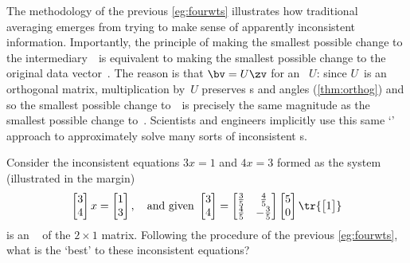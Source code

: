 The methodology of the previous \autoref{eg:fourwts} illustrates how traditional averaging emerges from trying to make sense of apparently inconsistent information.
Importantly, the principle of making the smallest possible change to the intermediary~\zv\ is equivalent to making the smallest possible change to the original data vector~\bv.
The reason is that \(\bv=U\zv\) for an ~\(U\): since \(U\)~is an orthogonal matrix, multiplication by~\(U\) preserves s and angles (\autoref{thm:orthog}) and so the smallest possible change to~\bv\ is precisely the same magnitude as the smallest possible change to~\zv.
Scientists and engineers implicitly use this same `' approach to approximately solve many sorts of inconsistent s.




\begin{activity}
Consider the inconsistent equations \(3x=1\) and \(4x=3\) formed as the system (illustrated in the margin)
%
\begin{equation*}
\begin{bmatrix} 3\\4 \end{bmatrix}x=\begin{bmatrix} 1\\3 \end{bmatrix},
\quad\text{and given }
\begin{bmatrix} 3\\4 \end{bmatrix}
=\begin{bmatrix} \frac35&\frac45\\\frac45&-\frac35 \end{bmatrix}
\begin{bmatrix} 5\\0 \end{bmatrix}
\tr{\begin{bmatrix} 1 \end{bmatrix}}
\end{equation*}
is an \svd\  of the \(2\times 1\) matrix.
Following the procedure of the previous \autoref{eg:fourwts}, what is the `best'  to these inconsistent equations?
\end{activity}





